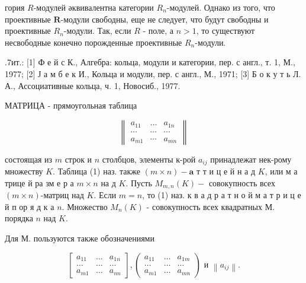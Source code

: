 \documentclass[10pt]{article}
\begin{document}
гория $R$-модулей әквивалентна категории $R_{n}$-модулей. Однако из того, что проективные $\boldsymbol{R}$-модули свободны, еще не следует, что будут свободны и проективные $R_{n}$-модули. Так, если $R$ - поле, а $n>1$, то существуют несвободные конечно порожденные проективные $R_{n}$-модули.



.7ит.: [1] Ф е й с К., Алгебра: кольца, модули и категории, пер. с англ., т. 1, М., 1977; [2] Ј а м б е к И., Кольца и модули, пер. с англ., М., 1971; [3] Б о к у т ь Л. А., Ассоциативные кольца, ч. 1, Новосиб., 1977.



МАТРИЦА - прямоугольная таблица



\[

\left\|\begin{array}{lll}

a_{11} & \ldots & a_{1 n} \\

\cdots & \cdots & \cdots \\

a_{m 1} & \cdots & a_{m n}

\end{array}\right\|

\]



состоящая из $m$ строк и $n$ столбцов, элементы к-рой $a_{i j}$ принадлежат нек-рому множеству $K$. Таблица (1) наз. также $(m \times n)-\mathbf{a}$ т т и ц е й н а д $K$, или м а трице й ра зм е р а $m \times n$ на д $K$. Пусть $M_{m, n}(K)-$ совокупность всех $(m \times n)$-матриц над $K$. Если $m=n$, то (1) наз. к в а д р а т н о й м а т р и ц е й п ор я д к а $n$. Множество $M_{n}(K)$ - совокупность всех квадратных М. порядка $n$ над $K$.



Для М. пользуются также обозначениями



\[

\left[\begin{array}{ccc}

a_{11} & \ldots & a_{1 n} \\

\ldots & \ldots & \ldots \\

a_{m 1} & \ldots & a_{n n}

\end{array}\right],\left(\begin{array}{ccc}

a_{11} & \ldots & a_{1 m} \\

\ldots & \ldots & \ldots \\

a_{m 1} & \ldots & a_{m n}

\end{array}\right) \text { и }\left\|a_{i j}\right\| .

\]
\end{document}
